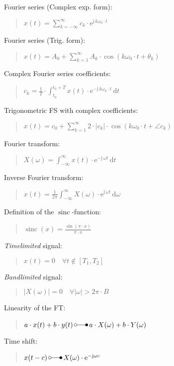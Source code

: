\documentclass[fontsize=9pt,a4paper,twocolumn]{scrartcl}
\DeclareMathOperator{\sinc}{sinc}
\begin{document}
Fourier series (Complex exp. form):
\begin{quote}
	$\boxed{x(t)=\sum_{k=-\infty}^\infty c_k\cdot\mathrm{e}^{\mathrm{j}\,k\omega_0\cdot t}}$
\end{quote}

Fourier series (Trig. form):
\begin{quote}
	$\boxed{x(t)=A_0+\sum_{k=1}^\infty A_k\cdot\cos(k\omega_0\cdot t+\theta_k)}$
\end{quote}

Complex Fourier series coefficients:
\begin{quote}
	$\boxed{c_k=\frac{1}{T}\cdot\int_{t_0}^{t_0+T} x(t)\cdot\mathrm{e}^{-\mathrm{j}\,k\omega_0\cdot t}\,\mathrm{d}t}$
\end{quote}

Trigonometric FS with complex coefficients:
\begin{quote}
	$x(t)=c_0+\sum_{k=1}^\infty 2\cdot|c_k|\cdot\cos(k\omega_0\cdot t+\angle c_k)$
\end{quote}

Fourier transform:
\begin{quote}
	$\boxed{X(\omega)=\int_{-\infty}^\infty x(t)\cdot\mathrm{e}^{-\mathrm{j}\,\omega t}\,\mathrm{d}t}$
\end{quote}

Inverse Fourier transform:
\begin{quote}
	$\boxed{x(t)=\frac{1}{2\pi}\int_{-\infty}^\infty X(\omega)\cdot\mathrm{e}^{\mathrm{j}\,\omega t}\,\mathrm{d}\omega}$
\end{quote}

Definition of the $\sinc$-function:
\begin{quote}
	$\boxed{\sinc(x)=\frac{\sin(\pi\cdot x)}{\pi\cdot x}}$
\end{quote}

\textit{Timelimited} signal:
\begin{quote}
	$x(t)= 0\quad\forall t\not\in[T_1,T_2]$
\end{quote}

\textit{Bandlimited} signal:
\begin{quote}
	$|X(\omega)|=0\quad\forall|\omega|>2\pi\cdot B$
\end{quote}

Linearity of the FT:
\begin{quote}
	$a\cdot x(t)+b\cdot y(t)\,\laplace\,a\cdot X(\omega)+b\cdot Y(\omega)$
\end{quote}

Time shift:
\begin{quote}
	$x(t-c)\,\laplace\,X(\omega)\cdot\mathrm{e}^{-\mathrm{j}\omega c}$
\end{quote}
\end{document}
